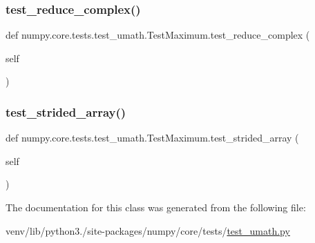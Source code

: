 \subsubsection{\texorpdfstring{test\+\_\+reduce\+\_\+complex()}{test\_reduce\_complex()}}
{\footnotesize\ttfamily def numpy.\+core.\+tests.\+test\+\_\+umath.\+Test\+Maximum.\+test\+\_\+reduce\+\_\+complex (\begin{DoxyParamCaption}\item[{}]{self }\end{DoxyParamCaption})}

\mbox{\label{classnumpy_1_1core_1_1tests_1_1test__umath_1_1TestMaximum_aea7ac1fc9cb5e815cb30a38a39896084}} 
\subsubsection{\texorpdfstring{test\+\_\+strided\+\_\+array()}{test\_strided\_array()}}
{\footnotesize\ttfamily def numpy.\+core.\+tests.\+test\+\_\+umath.\+Test\+Maximum.\+test\+\_\+strided\+\_\+array (\begin{DoxyParamCaption}\item[{}]{self }\end{DoxyParamCaption})}



The documentation for this class was generated from the following file\+:\begin{DoxyCompactItemize}
\item 
venv/lib/python3./site-\/packages/numpy/core/tests/\hyperlink{test__umath_8py}{test\+\_\+umath.\+py}\end{DoxyCompactItemize}
